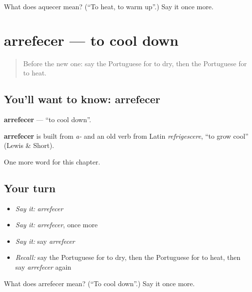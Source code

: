 \begin{tcolorbox}[breakable,colback=teal!4,colframe=teal!35!black,title={Before you move on}]
What does aquecer mean? (\textquotedblleft{}To heat, to warm up\textquotedblright{}.) Say it once more.
\end{tcolorbox}
\section[arrefecer]{arrefecer — to cool down}

\label{lesson:PT-C202-arrefecer}



\begin{quote}
Before the new one: say the Portuguese for to dry, then the Portuguese for to heat.
\end{quote}

\subsection*{You'll want to know: arrefecer}
\textbf{arrefecer} — \textquotedblleft{}to cool down\textquotedblright{}.

\begin{cousinweb}
\textbf{arrefecer} is built from \emph{a-} and an old verb from Latin \emph{refrigescere}, \textquotedblleft{}to grow cool\textquotedblright{} (Lewis \& Short).
\end{cousinweb}

\begin{grammarlens}[title={What you've built}]
One more word for this chapter.
\end{grammarlens}

\subsection*{Your turn}
\begin{itemize}
\raggedright
  \item \emph{Say it:} \emph{arrefecer}
  \item \emph{Say it:} \emph{arrefecer}, once more
  \item \emph{Say it:} say \emph{arrefecer}
  \item \emph{Recall:} say the Portuguese for to dry, then the Portuguese for to heat, then say \emph{arrefecer} again
\end{itemize}

\begin{tcolorbox}[breakable,colback=teal!4,colframe=teal!35!black,title={Before you move on}]
What does arrefecer mean? (\textquotedblleft{}To cool down\textquotedblright{}.) Say it once more.
\end{tcolorbox}
